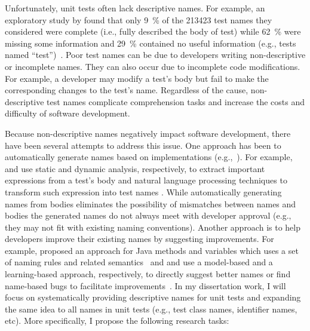 \documentclass[proposal.tex]{subfiles}
\begin{document}
Unfortunately, unit tests often lack descriptive names.
%
For example, an exploratory study by \citeauthor{zhang2015automatically} found that only \SI{9}{\percent} of the \num{213423} test names they considered were complete (i.e., fully described the body of test) while \SI{62}{\percent} were missing some information and \SI{29}{\percent} contained no useful information (e.g., tests named \enquote{test})~\cite{zhang2015automatically}.
%
Poor test names can be due to developers writing non-descriptive or incomplete names.
%
They can also occur due to incomplete code modifications.
%
For example, a developer may modify a test's body but fail to make the corresponding changes to the test's name.
%
Regardless of the cause, non-descriptive test names complicate comprehension tasks and increase the costs and difficulty of software development.


Because non-descriptive names negatively impact software development, there have been several attempts to address this issue.
%
One approach has been to automatically generate names based on implementations (e.g.,~\cite{arcuri2014automated, zhang2015automatically, daka2017generating}).
%
For example, \citeauthor{zhang2015automatically} and \citeauthor{daka2017generating} use static and dynamic analysis, respectively, to extract important expressions from a test's body and natural language processing techniques to transform such expression into test names \cite{zhang2015automatically, daka2017generating}. 
%
While automatically generating names from bodies eliminates the possibility of mismatches between names and bodies the generated names do not always meet with developer approval (e.g., they may not fit with existing naming conventions).
%
Another approach is to help developers improve their existing names by suggesting improvements.
%
For example, \citeauthor{host2009debugging} proposed an approach for Java methods and variables which uses a set of naming rules and related semantics~\cite{host2009debugging} and \citeauthor{allamanis2015suggesting} and \citeauthor{pradel2018deepbugs} use a model-based and a learning-based approach, respectively, to directly suggest better names or find name-based bugs to facilitate improvements~\cite{allamanis2015suggesting, pradel2018deepbugs}.
%
In my dissertation work, I will focus on systematically providing descriptive names for unit tests and expanding the same idea to all names in unit tests (e.g., test class names, identifier names, etc).
%
More specifically, I propose the following research tasks:
\end{document}
